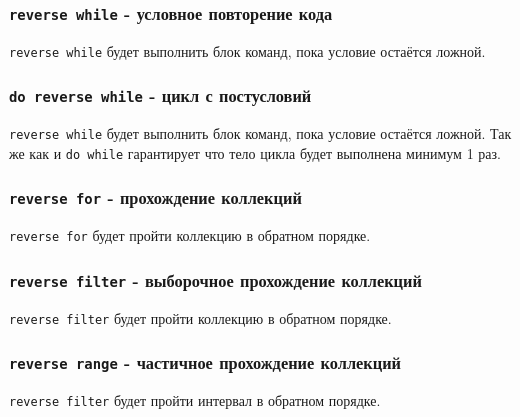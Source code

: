 \subsubsection{\lstinline|reverse while| - условное повторение кода}

\lstinline|reverse while| будет выполнить блок команд, пока условие остаётся ложной.

\subsubsection{\lstinline|do reverse while| - цикл с постусловий}

\lstinline|reverse while| будет выполнить блок команд, пока условие остаётся ложной. Так же как и \lstinline|do while| гарантирует что тело цикла будет выполнена минимум 1 раз.

\subsubsection{\lstinline|reverse for| - прохождение коллекций}

\lstinline|reverse for| будет пройти коллекцию в обратном порядке.

\subsubsection{\lstinline|reverse filter| - выборочное прохождение коллекций}

\lstinline|reverse filter| будет пройти коллекцию в обратном порядке.

\subsubsection{\lstinline|reverse range| - частичное прохождение коллекций}

\lstinline|reverse filter| будет пройти интервал в обратном порядке.

